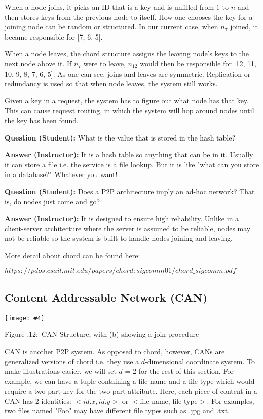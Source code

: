 \documentclass[twoside]{article}
\newcounter{lecnum}
\newcommand{\fig}[4]{
            \centerline{\texttt{[image: \#4]}}
            \begin{center}
            Figure \thelecnum.#1:~#3
            \end{center}
    }
\begin{document}
When a node joins, it picks an ID that is a key and is unfilled from $1$ to $n$ and then stores keys from the previous node to itself. How one chooses the key for a joining node can be random or structured. In our current case, when $n_7$ joined, it became responsible for [7, 6, 5].

When a node leaves, the chord structure assigns the leaving node's keys to the next node above it. If $n_7$ were to leave, $n_{12}$ would then be responsible for [12, 11, 10, 9, 8, 7, 6, 5].  As one can see, joins and leaves are symmetric. Replication or redundancy is used so that when node leaves, the system still works.

Given a key in a request, the system has to figure out what node has that key. This can cause request routing, in which the system will hop around nodes until the key has been found.

\textbf{Question (Student): } What is the value that is stored in the hash table?

\textbf{Answer (Instructor): } It is a hash table so anything that can be in it. Usually it can store a file i.e. the service is a file lookup. But it is like "what can you store in a database?" Whatever you want!

\textbf{Question (Student): } Does a P2P architecture imply an ad-hoc network? That is, do nodes just come and go?

\textbf{Answer (Instructor): } It is designed to ensure high reliability. Unlike in a client-server architecture where the server is assumed to be reliable, nodes may not be reliable so the system is built to handle nodes joining and leaving.

More detail about chord can be found here:  

$https://pdos.csail.mit.edu/papers/chord:sigcomm01/chord\_sigcomm.pdf$


\subsection{Content Addressable Network (CAN)}
\fig{12}{0.5}{CAN Structure, with (b) showing a join procedure}{can.png}

CAN is another P2P system. As opposed to chord, however, CANs are generalized versions of chord i.e. they use a $d$-dimensional coordinate system. To make illustrations easier, we will set $d$ = 2 for the rest of this section. For example, we can have a tuple containing a file name and a file type which would require a two part key for the two part attribute. Here, each piece of content in a CAN has 2 identities: $<id.x,id.y>$ or $<$file name, file type$>$. For examples, two files named "Foo" may have different file types such as .jpg and .txt.  
\end{document}

